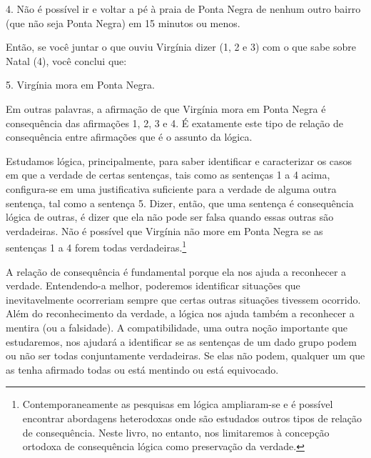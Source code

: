 \begin{earg}
	\item[4.] Não é possível ir e voltar a pé à praia de Ponta Negra de nenhum outro bairro (que não seja Ponta Negra) em 15 minutos ou menos.
\end{earg}
Então, se você juntar o que ouviu Virgínia dizer (1, 2 e 3) com o que sabe sobre Natal (4), você conclui que:
\begin{earg}
	\item[5.]  Virgínia mora em Ponta Negra.
\end{earg}
Em outras palavras, a afirmação de que Virgínia mora em Ponta Negra é consequência das afirmações 1, 2, 3 e 4.
É exatamente este tipo de relação de consequência entre afirmações que é o assunto da lógica.

Estudamos lógica, principalmente, para saber identificar e caracterizar os casos em que a verdade de certas sentenças, tais como as sentenças 1 a 4 acima, configura-se em uma justificativa suficiente para a verdade de alguma outra sentença, tal como a sentença 5.
Dizer, então, que uma sentença é consequência lógica de outras, é dizer que ela não pode ser falsa quando essas outras são verdadeiras.
Não é possível que Virgínia não more em Ponta Negra se as sentenças 1 a 4 forem todas verdadeiras.\footnote{
	Contemporaneamente as pesquisas em lógica ampliaram-se e é possível encontrar abordagens heterodoxas onde são estudados outros tipos de relação de consequência.
	Neste livro, no entanto, nos limitaremos à concepção ortodoxa de consequência lógica como preservação da verdade.}

A relação de consequência é fundamental porque ela nos ajuda a reconhecer a verdade.
Entendendo-a melhor, poderemos identificar situações que inevitavelmente ocorreriam sempre que certas outras situações tivessem ocorrido.
Além do reconhecimento da verdade, a lógica nos ajuda também a reconhecer a mentira (ou a falsidade).
A compatibilidade, uma outra noção importante que estudaremos, nos ajudará a identificar se as sentenças de um dado grupo podem ou não ser todas conjuntamente verdadeiras.
Se elas não podem, qualquer um que as tenha afirmado todas ou está mentindo ou está equivocado.



